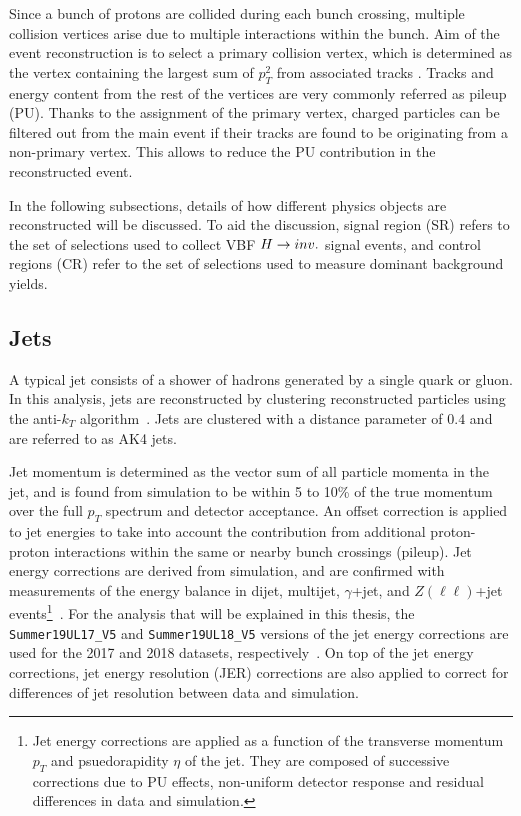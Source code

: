 Since a bunch of protons are collided during each bunch crossing, multiple collision vertices arise
due to multiple interactions within the bunch. Aim of the event reconstruction is to select a primary
collision vertex, which is determined as the vertex containing the largest sum of $p_{T}^2$ from associated tracks \cite{cms:phase2_upgrade}.
Tracks and energy content from the rest of the vertices are very commonly referred as pileup (PU). Thanks to the assignment of the
primary vertex, charged particles can be filtered out from the main event if their tracks are found to be originating 
from a non-primary vertex. This allows to reduce the PU contribution in the reconstructed event. 

In the following subsections, details of how different physics objects are reconstructed will be discussed. To aid the
discussion, signal region (SR) refers to the set of selections used to collect VBF $H \rightarrow inv.$ signal events,
and control regions (CR) refer to the set of selections used to measure dominant background yields.

\subsection{Jets}
\label{sec:objects_jets}

A typical jet consists of a shower of hadrons generated by a single quark or gluon.
In this analysis, jets are reconstructed by clustering reconstructed particles
using the anti-$k_{T}$ algorithm~\cite{Cacciari:2008gp}. Jets are
clustered with a distance parameter of $0.4$ and are referred to as AK4
jets. 

Jet momentum is determined as the vector sum of all particle momenta
in the jet, and is found from simulation to be within 5 to 10\% of the
true momentum over the full $p_{T}$ spectrum and detector acceptance. An
offset correction is applied to jet energies to take into account the
contribution from additional proton-proton interactions within the
same or nearby bunch crossings (pileup). Jet energy corrections are
derived from simulation, and are confirmed with
measurements of the energy balance in dijet, multijet, $\gamma$+jet,
and $Z(\ell\ell)$+jet 
events\footnote{Jet energy corrections are applied
as a function of the transverse momentum $p_{T}$ and psuedorapidity $\eta$ of the jet. They
are composed of successive corrections due to PU effects, non-uniform detector response and
residual differences in data and simulation.}~\cite{Khachatryan:2016kdb}. 
For the analysis that will be explained in this thesis, the
\texttt{Summer19UL17\_V5} and \texttt{Summer19UL18\_V5} versions of
the jet energy corrections are used for the 2017 and 2018 datasets,
respectively~\cite{JME:JECRecommendations}. On top of the jet energy corrections,
jet energy resolution (JER) corrections are also applied to correct for differences of jet resolution
between data and simulation.

